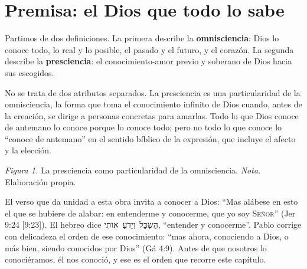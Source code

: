 \documentclass[11pt,letterpaper]{article}
\newcommand{\heb}[1]{\mbox{\foreignlanguage{hebrew}{#1}}}
\newcommand{\SENOR}{\textsc{Señor}}
\newcommand{\destacar}[1]{\textbf{\textcolor{azul}{#1}}}
\begin{document}
\section{Premisa: el Dios que todo lo sabe}

Partimos de dos definiciones. La primera describe la \destacar{omnisciencia}: Dios lo conoce todo, lo real y lo posible, el pasado y el futuro, y el corazón. La segunda describe la \destacar{presciencia}: el conocimiento-amor previo y soberano de Dios hacia sus escogidos.

No se trata de dos atributos separados. La presciencia es una particularidad de la omnisciencia, la forma que toma el conocimiento infinito de Dios cuando, antes de la creación, se dirige a personas concretas para amarlas. Todo lo que Dios conoce de antemano lo conoce porque lo conoce todo; pero no todo lo que conoce lo ``conoce de antemano'' en el sentido bíblico de la expresión, que incluye el afecto y la elección.

\begin{center}
\par
{\footnotesize\color{gris}\textit{Figura 1.} La presciencia como particularidad de la omnisciencia. \textit{Nota.} Elaboración propia.}
\end{center}

El verso que da unidad a esta obra invita a conocer a Dios: ``Mas alábese en esto el que se hubiere de alabar: en entenderme y conocerme, que yo soy \SENOR'' (Jer 9:24 [9:23]). El hebreo dice \heb{הַשְׂכֵּל וְיָדֹעַ אוֹתִי}, ``entender y conocerme''. Pablo corrige con delicadeza el orden de ese conocimiento: ``mas ahora, conociendo a Dios, o más bien, siendo conocidos por Dios'' (Gá 4:9). Antes de que nosotros lo conociéramos, él nos conoció, y ese es el orden que recorre este capítulo.
\end{document}
